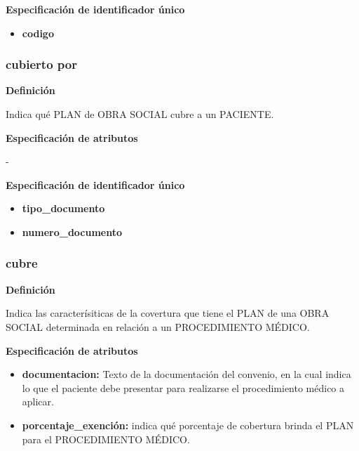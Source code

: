 \documentclass[a4paper,11pt]{article}
\begin{document}
\textbf{Especificación de identificador único}

\begin{itemize}

     \item \textbf{codigo}

\end{itemize}

\subsubsection{\textbf{cubierto por}}

\textbf{Definición}

Indica qué PLAN de OBRA SOCIAL cubre a un PACIENTE.

\textbf{Especificación de atributos}

-

\textbf{Especificación de identificador único}

\begin{itemize}

     \item \textbf{tipo\_documento}

     \item \textbf{numero\_documento}

\end{itemize}

\subsubsection{\textbf{cubre}}

\textbf{Definición}

Indica las caracterísiticas de la covertura que tiene el PLAN de una 
OBRA SOCIAL determinada en relación a un PROCEDIMIENTO MÉDICO.

\textbf{Especificación de atributos}

\begin{itemize}

     \item \textbf{documentacion:} Texto de la documentación del convenio, en la cual 
     indica lo que el paciente debe presentar para realizarse el procedimiento médico 
     a aplicar.

     \item \textbf{porcentaje\_exención:} indica qué porcentaje de cobertura brinda
     el PLAN para el PROCEDIMIENTO MÉDICO.

\end{itemize}
\end{document}
